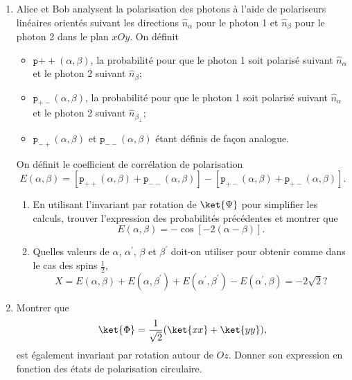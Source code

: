 \begin{enumerate}
\item Alice et Bob analysent la polarisation des photons à l'aide de
polariseurs linéaires orientés suivant les directions $\hat{n}_{\alpha}$ pour
le photon 1 et $\hat{n}_{\beta}$ pour le photon 2 dans le plan $xOy$. On définit

\begin{itemize}
\item $\texttt{p}{++}(\alpha,\beta)$, la probabilité pour que le photon 1 soit
polarisé suivant $\hat{n}_{\alpha}$ et le photon 2 suivant $\hat{n}_{\beta}$;

\item $\texttt{p}_{+-}(\alpha,\beta)$, la probabilité pour que le photon 1 soit
polarisé suivant $\hat{n}_{\alpha}$ et le photon 2 suivant
$\hat{n}_{\beta_{\bot}}$;

\item $\texttt{p}_{-+}(\alpha,\beta)$ et $\texttt{p}_{--}(\alpha,\beta)$ étant
définis de façon analogue.
\end{itemize}

On définit le coefficient de corrélation de polarisation%
\begin{equation}
E(\alpha,\beta)=[\texttt{p}_{++}(\alpha,\beta)+\texttt{p}_{--}(\alpha,\beta)]-[
\texttt{p}_{+-} (\alpha,\beta) +\texttt{p}_{+-}(\alpha,\beta)].
\end{equation}


\begin{enumerate}
\item En utilisant l'invariant par rotation de $\ket{\Psi}$ pour simplifier
les calculs, trouver l'expression des probabilités précédentes et montrer que%
\begin{equation}
E(\alpha,\beta)=-\cos[-2(\alpha-\beta)].
\end{equation}

\item Quelles valeurs de $\alpha$, $\alpha^{\prime}$, $\beta$ et
$\beta^{\prime}$ doit-on utiliser pour obtenir comme dans le cas des spins
$\frac{1}{2}$,
\begin{equation}
X=E(\alpha,\beta)+E(\alpha,\beta^{\prime})+E(\alpha^{\prime},\beta^{\prime
})-E(\alpha^{\prime},\beta)=-2\sqrt{2}?
\end{equation}

\end{enumerate}

\item Montrer que
\begin{equation}
\ket{\Phi}=\frac{1}{\sqrt{2}}(\ket{xx}+\ket{yy}),
\end{equation}
est également invariant par rotation autour de $Oz$. Donner son expression en
fonction des états de polarisation circulaire.
\end{enumerate}


